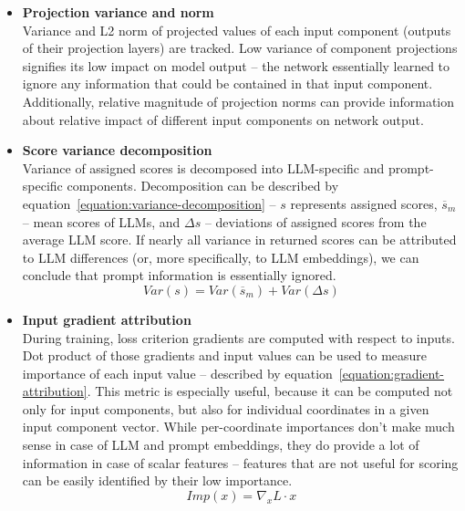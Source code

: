 \documentclass[a4paper,11pt,twoside]{report}
\theoremstyle{definition}
\begin{document}
\begin{itemize}
    \item \textbf{Projection variance and norm} \\
    Variance and L2 norm of projected values of each input component (outputs of their projection layers) are tracked. Low variance of component projections signifies its low impact on model output -- the network essentially learned to ignore any information that could be contained in that input component. Additionally, relative magnitude of projection norms can provide information about relative impact of different input components on network output. 
    \item \textbf{Score variance decomposition} \\
    Variance of assigned scores is decomposed into LLM-specific and prompt-specific components. Decomposition can be described by equation~\ref{equation:variance-decomposition} -- $s$ represents assigned scores, $\overline{s}_m$ -- mean scores of LLMs, and $\Delta s$ -- deviations of assigned scores from the average LLM score. If nearly all variance in returned scores can be attributed to LLM differences (or, more specifically, to LLM embeddings), we can conclude that prompt information is essentially ignored. \\
    \begin{equation}
    \label{equation:variance-decomposition}
        Var(s) = Var(\overline{s}_m) + Var(\Delta s)
    \end{equation}
    \item \textbf{Input gradient attribution} \\
    During training, loss criterion gradients are computed with respect to inputs. Dot product of those gradients and input values can be used to measure importance of each input value -- described by equation~\ref{equation:gradient-attribution}. This metric is especially useful, because it can be computed not only for input components, but also for individual coordinates in a given input component vector. While per-coordinate importances don't make much sense in case of LLM and prompt embeddings, they do provide a lot of information in case of scalar features -- features that are not useful for scoring can be easily identified by their low importance. \\
    \begin{equation}
    \label{equation:gradient-attribution}
        Imp(x) = \nabla_x L \cdot x
    \end{equation}
\end{itemize}
\end{document}
